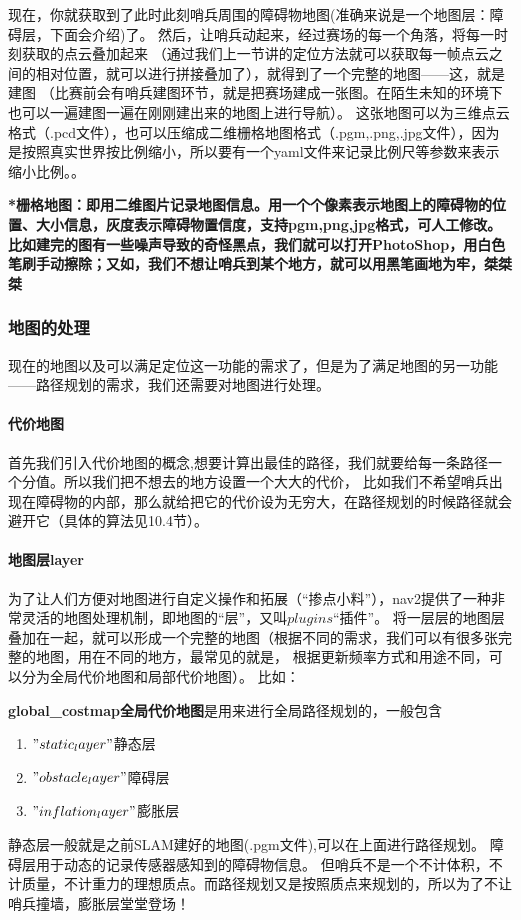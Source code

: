 现在，你就获取到了此时此刻哨兵周围的障碍物地图(准确来说是一个地图层：障碍层，下面会介绍)了。
然后，让哨兵动起来，经过赛场的每一个角落，将每一时刻获取的点云叠加起来
（通过我们上一节讲的定位方法就可以获取每一帧点云之间的相对位置，就可以进行拼接叠加了），就得到了一个完整的地图——这，就是建图
（比赛前会有哨兵建图环节，就是把赛场建成一张图。在陌生未知的环境下也可以一遍建图一遍在刚刚建出来的地图上进行导航）。
这张地图可以为三维点云格式（.pcd文件），也可以压缩成二维栅格地图格式（.pgm,.png,.jpg文件），因为是按照真实世界按比例缩小，所以要有一个yaml文件来记录比例尺等参数来表示缩小比例。。

\textbf{*栅格地图：即用二维图片记录地图信息。用一个个像素表示地图上的障碍物的位置、大小信息，灰度表示障碍物置信度，支持pgm,png,jpg格式，可人工修改。
比如建完的图有一些噪声导致的奇怪黑点，我们就可以打开PhotoShop，用白色笔刷手动擦除；又如，我们不想让哨兵到某个地方，就可以用黑笔画地为牢，桀桀桀}

\subsubsection{ 地图的处理}
现在的地图以及可以满足定位这一功能的需求了，但是为了满足地图的另一功能——路径规划的需求，我们还需要对地图进行处理。

\paragraph{ 代价地图}
首先我们引入代价地图的概念,想要计算出最佳的路径，我们就要给每一条路径一个分值。所以我们把不想去的地方设置一个大大的代价，
比如我们不希望哨兵出现在障碍物的内部，那么就给把它的代价设为无穷大，在路径规划的时候路径就会避开它（具体的算法见10.4节）。

\paragraph{ 地图层layer}
为了让人们方便对地图进行自定义操作和拓展（“掺点小料”），nav2提供了一种非常灵活的地图处理机制，即地图的“层”，又叫$plugins$“插件”。
将一层层的地图层叠加在一起，就可以形成一个完整的地图（根据不同的需求，我们可以有很多张完整的地图，用在不同的地方，最常见的就是，
根据更新频率方式和用途不同，可以分为全局代价地图和局部代价地图）。
比如：

\textbf{global\_costmap全局代价地图}是用来进行全局路径规划的，一般包含
\begin{enumerate}
    \item $"static_layer"$静态层
    \item $"obstacle_layer"$障碍层
    \item $"inflation_layer"$膨胀层
\end{enumerate}
静态层一般就是之前SLAM建好的地图(.pgm文件),可以在上面进行路径规划。
障碍层用于动态的记录传感器感知到的障碍物信息。
但哨兵不是一个不计体积，不计质量，不计重力的理想质点。而路径规划又是按照质点来规划的，所以为了不让哨兵撞墙，膨胀层堂堂登场！

